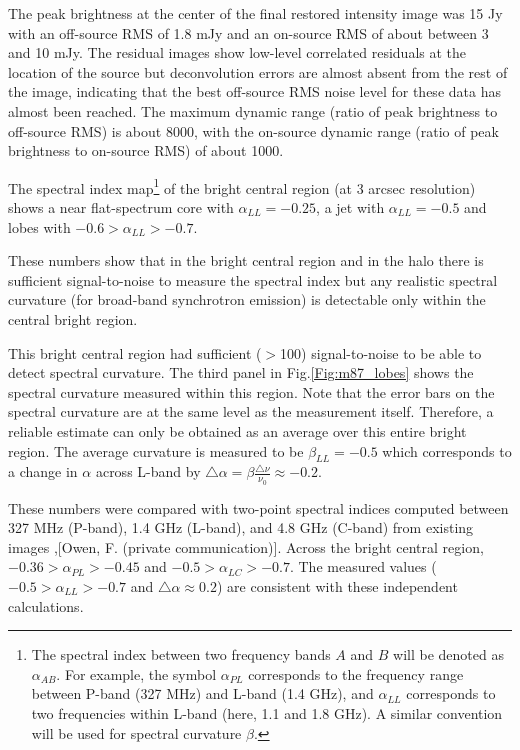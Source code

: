 \documentclass[structabstract]{stylefiles/aa}
\renewcommand{\cite}{\citep}
\begin{document}
The peak brightness at the center of the final restored intensity image
was 15 Jy with an off-source RMS of 1.8 mJy and an
on-source RMS of about between 3 and 10 mJy.
The residual images show low-level correlated residuals at the location of 
the source but deconvolution errors are almost absent from the rest of the 
image, indicating that the best off-source RMS noise level for these data has
almost been reached.
The maximum dynamic range (ratio of peak brightness to off-source RMS)
is about 8000, with the on-source dynamic range (ratio of peak brightness to
on-source RMS) of about 1000.

The spectral index map\footnote
{The spectral index between two frequency bands $A$ and $B$ will be denoted 
as $\alpha_{AB}$. For example, the symbol $\alpha_{PL}$ corresponds to the
frequency range between P-band (327 MHz) and L-band (1.4 GHz), and
$\alpha_{LL}$ corresponds to two frequencies within L-band (here, 1.1 and 1.8 GHz).
A similar convention will be used for spectral curvature $\beta$.
} of the bright central region (at 3 arcsec resolution)
shows a near flat-spectrum core with $\alpha_{LL} = -0.25$,
a jet with $\alpha_{LL} = -0.5$ and lobes with $-0.6 > \alpha_{LL} > -0.7$.

These numbers show that in the bright central region and in the halo 
there is sufficient signal-to-noise to measure the spectral index but any 
realistic spectral curvature (for broad-band synchrotron emission)
is detectable only within the central bright region.


This bright central region had sufficient
($>$100) signal-to-noise to be able to detect spectral curvature. 
The third panel in Fig.\ref{Fig:m87_lobes} shows the spectral curvature
measured within this region.
Note that the error bars on the spectral curvature are at the same level as 
the measurement itself. Therefore, a reliable estimate can only be obtained as
an average over this entire bright region. The average curvature is
measured to be $\beta_{LL} = -0.5$ which corresponds to a change in $\alpha$ 
across L-band by
$\triangle \alpha = \beta \frac{\triangle\nu}{\nu_0} \approx -0.2$.

These numbers were compared with two-point spectral indices computed between
327 MHz (P-band), 1.4 GHz (L-band), and 4.8 GHz (C-band) from existing images
\cite{Owen_2000},[Owen, F. (private communication)]. 
Across the bright central region, $-0.36 > \alpha_{PL} > -0.45$ and 
$-0.5 > \alpha_{LC} > -0.7$. The measured values ($-0.5 > \alpha_{LL} > -0.7$
and $\triangle\alpha \approx 0.2$) are consistent with these
independent calculations.
\end{document}
